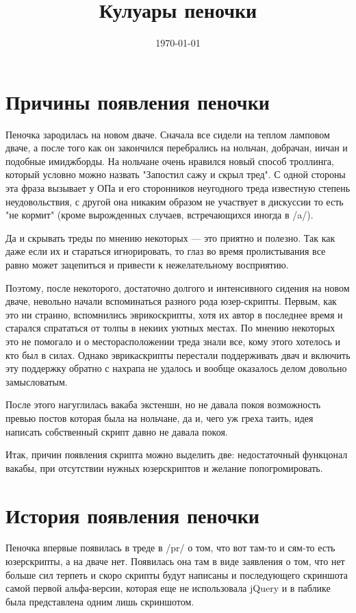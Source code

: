 \documentclass[12pt,a4paper]{article}
\title{Кулуары пеночки}
\date{\today}
\begin{document}
\maketitle
\section*{Причины появления пеночки}

Пеночка зародилась на новом дваче. Сначала все сидели на теплом ламповом дваче, а после того как он закончился перебрались на нольчан, добрачан, иичан и подобные имиджборды. На нольчане очень нравился новый способ троллинга, который условно можно назвать "Запостил сажу и скрыл тред". С одной стороны эта фраза вызывает у ОПа и его сторонников неугодного треда известную степень неудовольствия, с другой она никаким образом не участвует в дискуссии то есть "не кормит" (кроме вырожденных случаев, встречающихся иногда в /a/).

Да и скрывать треды по мнению некоторых --- это приятно и полезно. Так как даже если их и стараться игнорировать, то глаз во время пролистывания все равно может зацепиться и привести к нежелательному восприятию.

Поэтому, после некоторого, достаточно долгого и интенсивного сидения на новом дваче, невольно начали вспоминаться разного рода юзер-скрипты. Первым, как это ни странно, вспомнились эврикоскрипты, хотя их автор в последнее время и старался спрататься от толпы в некиих уютных местах. По мнению некоторых это не помогало и о месторасположении треда знали все, кому этого хотелось и кто был в силах. Однако эврикаскрипты перестали поддерживать двач и включить эту поддержку обратно с нахрапа не удалось и вообще оказалось делом довольно замысловатым.

После этого нагуглилась вакаба экстеншн, но не давала покоя возможность превью постов которая была на нольчане, да и, чего уж греха таить, идея написать собственный скрипт давно не давала покоя.

Итак, причин появления скрипта можно выделить две: недостаточный функцонал вакабы, при отсутствии нужных юзерскриптов и желание попогромировать.

\section*{История появления пеночки}

Пеночка впервые появилась в треде в /pr/ о том, что вот там-то и сям-то есть юзерскрипты, а на дваче нет. Появилась она там в виде заявления о том, что нет больше сил терпеть и скоро скрипты будут написаны и последующего скриншота самой первой альфа-версии, которая еще не использовала jQuery и в паблике была представлена одним лишь скриншотом.
\end{document}
